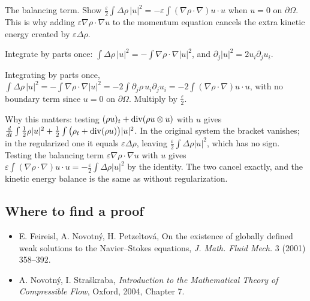 \begin{exercise}
  The balancing term. Show $\frac{\varepsilon}{2}\int\Delta\rho\,|u|^2 = -\varepsilon\int(\nabla\rho\cdot\nabla)u\cdot u$ when $u = 0$ on $\partial\Omega$. This is why adding $\varepsilon\nabla\rho\cdot\nabla u$ to the momentum equation cancels the extra kinetic energy created by $\varepsilon\Delta\rho$.
  \begin{hint}
    Integrate by parts once: $\int\Delta\rho\,|u|^2 = -\int\nabla\rho\cdot\nabla|u|^2$, and $\partial_j|u|^2 = 2u_i\partial_ju_i$.
  \end{hint}
  \begin{solution}
    Integrating by parts once, $\int\Delta\rho\,|u|^2 = -\int\nabla\rho\cdot\nabla|u|^2 = -2\int\partial_j\rho\,u_i\partial_ju_i = -2\int(\nabla\rho\cdot\nabla)u\cdot u$, with no boundary term since $u = 0$ on $\partial\Omega$. Multiply by $\frac\varepsilon2$.

    Why this matters: testing $(\rho u)_t + \operatorname{div}(\rho u\otimes u)$ with $u$ gives $\frac{d}{dt}\int\frac12\rho|u|^2 + \frac12\int\big(\rho_t + \operatorname{div}(\rho u)\big)|u|^2$. In the original system the bracket vanishes; in the regularized one it equals $\varepsilon\Delta\rho$, leaving $\frac\varepsilon2\int\Delta\rho|u|^2$, which has no sign. Testing the balancing term $\varepsilon\nabla\rho\cdot\nabla u$ with $u$ gives $\varepsilon\int(\nabla\rho\cdot\nabla)u\cdot u = -\frac\varepsilon2\int\Delta\rho|u|^2$ by the identity. The two cancel exactly, and the kinetic energy balance is the same as without regularization.
  \end{solution}
\end{exercise}

\subsection*{Where to find a proof}

\begin{itemize}
\item E. Feireisl, A. Novotný, H. Petzeltová, On the existence of globally defined weak solutions to the Navier--Stokes equations, \emph{J. Math. Fluid Mech.} 3 (2001) 358--392.
\item A. Novotný, I. Straškraba, \emph{Introduction to the Mathematical Theory of Compressible Flow}, Oxford, 2004, Chapter 7.
\end{itemize}

\neededfor
